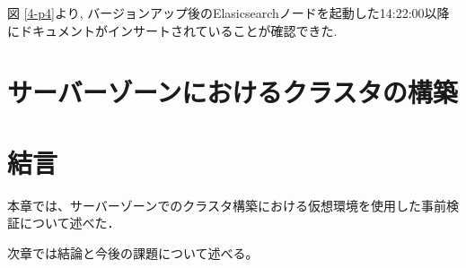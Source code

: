 図 \ref{4-p4}より, バージョンアップ後のElasicsearchノードを起動した14:22:00以降にドキュメントがインサートされていることが確認できた.

\section{サーバーゾーンにおけるクラスタの構築}

\section{結言}
本章では、サーバーゾーンでのクラスタ構築における仮想環境を使用した事前検証について述べた．

次章では結論と今後の課題について述べる。
